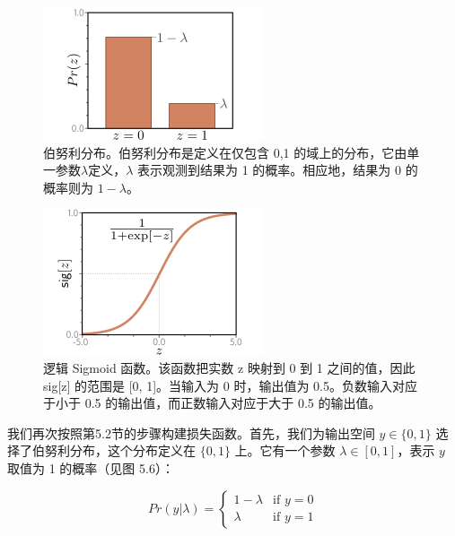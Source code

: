 \begin{figure}[ht!]
	\centering
	\includegraphics[width=0.7\linewidth]{png/chapter5/LossBern.png}
	\caption{伯努利分布。伯努利分布是定义在仅包含 {0,1} 的域上的分布，它由单一参数\(\lambda\)定义，\(\lambda\) 表示观测到结果为 1 的概率。相应地，结果为 0 的概率则为 \(1 − \lambda\)。}
\end{figure}

\begin{figure}[ht!]
	\centering
	\includegraphics[width=0.7\linewidth]{png/chapter5/LossLogisticSigmoid.png}
	\caption{逻辑 Sigmoid 函数。该函数把实数 z 映射到 0 到 1 之间的值，因此 sig[z] 的范围是 [0, 1]。当输入为 0 时，输出值为 0.5。负数输入对应于小于 0.5 的输出值，而正数输入对应于大于 0.5 的输出值。}
\end{figure}



我们再次按照第5.2节的步骤构建损失函数。首先，我们为输出空间 \(y \in \{0, 1\}\) 选择了伯努利分布，这个分布定义在 \(\{0, 1\}\) 上。它有一个参数 \(\lambda \in [0, 1]\)，表示 \(y\) 取值为 1 的概率（见图 5.6）：

\begin{equation}
Pr(y|\lambda) = 
\begin{cases} 
	1 - \lambda & \text{if } y = 0 \\
	\lambda & \text{if } y = 1  
\end{cases} 
\end{equation}


